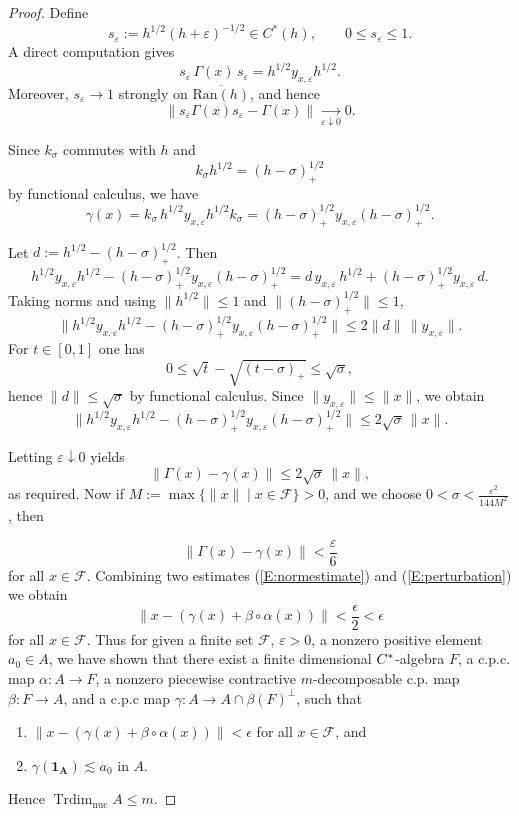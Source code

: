 \documentclass[12pt]{amsart}
\theoremstyle{plain}
\theoremstyle{definition}
\def\Trdim{\operatorname{Trdim}}
\def\nuc{\operatorname{nuc}}
\newcommand{\mc}{\mathcal}
\numberwithin{equation}{section}
\begin{document}
\begin{proof}
Define
\[
s_\varepsilon:=h^{1/2}(h+\varepsilon)^{-1/2}\in C^*(h),\qquad 0\le s_\varepsilon\le 1.
\]
A direct computation gives
\[
s_\varepsilon\,\Gamma(x)\,s_\varepsilon
= h^{1/2}y_{x,\varepsilon}h^{1/2}.
\]
Moreover, $s_\varepsilon\to 1$ strongly on $\overline{\mathrm{Ran}(h)}$, and hence
\[
\|s_\varepsilon\Gamma(x)s_\varepsilon-\Gamma(x)\|\xrightarrow[\varepsilon\downarrow 0]{}0.
\]

Since $k_\sigma$ commutes with $h$ and
\[
k_\sigma h^{1/2}=(h-\sigma)_+^{1/2}
\]
by functional calculus, we have
\[
\gamma(x)
=k_\sigma\,h^{1/2}y_{x,\varepsilon}h^{1/2}k_\sigma
=(h-\sigma)_+^{1/2}y_{x,\varepsilon}(h-\sigma)_+^{1/2}.
\]

Let $d:=h^{1/2}-(h-\sigma)_+^{1/2}$. Then
\[
h^{1/2}y_{x,\varepsilon}h^{1/2}
-(h-\sigma)_+^{1/2}y_{x,\varepsilon}(h-\sigma)_+^{1/2}
= d\,y_{x,\varepsilon}\,h^{1/2}
+(h-\sigma)_+^{1/2}y_{x,\varepsilon}\,d.
\]
Taking norms and using $\|h^{1/2}\|\le 1$ and $\|(h-\sigma)_+^{1/2}\|\le 1$,
\[
\|h^{1/2}y_{x,\varepsilon}h^{1/2}
-(h-\sigma)_+^{1/2}y_{x,\varepsilon}(h-\sigma)_+^{1/2}\|
\le 2\|d\|\,\|y_{x,\varepsilon}\|.
\]
For  $t\in[0,1]$ one has
\[
0\le \sqrt{t}-\sqrt{(t-\sigma)_+}\le \sqrt{\sigma},
\]
hence $\|d\|\le \sqrt{\sigma}$ by functional calculus.
Since $\|y_{x,\varepsilon}\|\le \|x\|$, we obtain
\[
\|h^{1/2}y_{x,\varepsilon}h^{1/2}
-(h-\sigma)_+^{1/2}y_{x,\varepsilon}(h-\sigma)_+^{1/2}\|
\le 2\sqrt{\sigma}\,\|x\|.
\]

Letting $\varepsilon\downarrow 0$ yields
\[
\|\Gamma(x)-\gamma(x)\|\le 2\sqrt{\sigma}\,\|x\|,
\]
as required.
Now if $M:=\max\{ \|x\| \mid x \in \mc{F}\}> 0$, and we choose $0< \sigma < \frac{\varepsilon^2}{144M^2}$, then

\begin{equation}\label{E:perturbation}
\|\Gamma(x)-\gamma(x)\|<\frac{\varepsilon}{6}
\end{equation}
for all $x \in \mc{F}$. 
Combining two estimates (\ref{E:normestimate}) and (\ref{E:perturbation}) we obtain 
\[ 
\| x - (\gamma(x) + \beta \circ \alpha (x))\| < \frac{\epsilon}{2}< \epsilon
\]
for all $x \in \mc{F}$. 
Thus for given a finite set $\mc{F}$, $\varepsilon>0$, a nonzero positive element $a_0 \in A$, we have shown that there exist a finite dimensional $C\sp*$-algebra $F$, a c.p.c. map $\alpha: A \to F$, a nonzero piecewise contractive $m$-decomposable c.p. map $\beta: F \to A$, and a c.p.c map $\gamma: A \to A\cap \beta(F)^{\perp}$, such that 
\begin{enumerate}
\item $ \|x - (\gamma(x)+ \beta \circ \alpha (x)) \| < \epsilon$ for all $x\in \mc{F}$, and 
\item $\gamma(\mathbf{1_A}) \lesssim a_0$ in $A$. 
\end{enumerate}
Hence $\Trdim_{\nuc}A \le m$. 
\end{proof}
\end{document}
